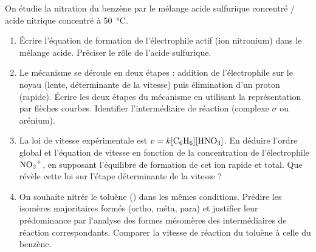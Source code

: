 \documentclass[11pt]{article}
\begin{document}
\begin{exercice}
On étudie la nitration du benzène par le mélange acide sulfurique concentré / acide nitrique concentré à \SI{50}{\celsius}.
\begin{enumerate}
    \item Écrire l'équation de formation de l'électrophile actif (ion nitronium) dans le mélange acide. Préciser le rôle de l'acide sulfurique.
    \item Le mécanisme se déroule en deux étapes : addition de l'électrophile sur le noyau (lente, déterminante de la vitesse) puis élimination d'un proton (rapide). Écrire les deux étapes du mécanisme en utilisant la représentation par flèches courbes. Identifier l'intermédiaire de réaction (complexe $\sigma$ ou arénium).
    \item La loi de vitesse expérimentale est $v = k[\ce{C6H6}][\ce{HNO3}]$. En déduire l'ordre global et l'équation de vitesse en fonction de la concentration de l'électrophile $\ce{NO2+}$, en supposant l'équilibre de formation de cet ion rapide et total. Que révèle cette loi sur l'étape déterminante de la vitesse ?
    \item On souhaite nitrér le toluène () dans les mêmes conditions. Prédire les isomères majoritaires formés (ortho, méta, para) et justifier leur prédominance par l'analyse des formes mésomères des intermédiaires de réaction correspondants. Comparer la vitesse de réaction du toluène à celle du benzène.
\end{enumerate}
\end{exercice}
\end{document}
